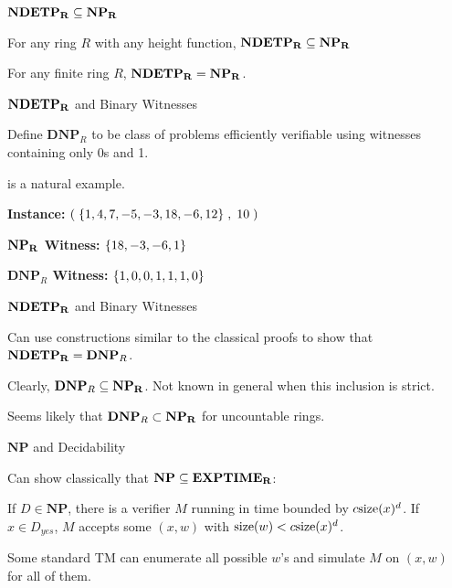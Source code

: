 \documentclass[c]{beamer}
\begin{document}
\begin{frame}{$\mathbf{NDETP_R} \subseteq \mathbf{NP_R}$}
  
  \begin{theorem}
    For any ring $R$ with any height function, $\mathbf{NDETP_R} \subseteq \mathbf{NP_R}$
  \end{theorem}

  \begin{theorem}
    For any finite ring $R$, $\mathbf{NDETP_R} = \mathbf{NP_R}$.
  \end{theorem}
  
\end{frame}

\begin{frame}{$\mathbf{NDETP_R}$ and Binary Witnesses}

  Define $\mathbf{DNP}_R$ to be class of problems efficiently
  verifiable using witnesses containing only 0s and 1.\pause

  \vspace{\baselineskip}

  \subsum{} is a natural example.\pause
  
  \vspace{\baselineskip}

  \textbf{Instance:} $(\;\{1,4,7,-5,-3,18,-6,12\}\;, \;10\;)$

  \textbf{$\mathbf{NP_R}$ Witness:}  $\{18, -3, -6, 1\}$
  
  \textbf{$\mathbf{DNP}_R$ Witness:}  $\{1,0,0,1,1,1,0\}$
\end{frame}

\begin{frame}{$\mathbf{NDETP_R}$ and Binary Witnesses}

  Can use constructions similar to the classical proofs to show that
  $\mathbf{NDETP_R} = \mathbf{DNP}_R$.\pause

  \vspace{\baselineskip}

  Clearly, $\mathbf{DNP}_R \subseteq \mathbf{NP_R}$.  Not known in general when
  this inclusion is strict.\pause

  \vspace{\baselineskip}

  Seems likely that $\mathbf{DNP}_R \subset \mathbf{NP_R}$ for uncountable
  rings.
  
\end{frame}

\begin{frame}{$\mathbf{NP}$ and Decidability}

  Can show classically that $\mathbf{NP} \subseteq \mathbf{EXPTIME_R}$:

  \vspace{\baselineskip}

  If $D \in \mathbf{NP}$, there is a verifier $M$ running in time
  bounded by $c\text{size}(x)^d$.  If $x \in D_{yes}$, $M$ accepts some
  $(x,w)$ with $\text{size}(w) < c\text{size}(x)^d$. \pause

  \vspace{\baselineskip}

  Some standard TM can enumerate all possible $w$'s and simulate $M$
  on $(x,w)$ for all of them.
\end{frame}
\end{document}
